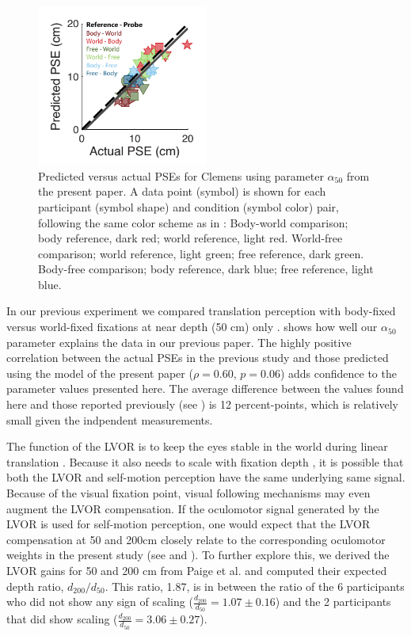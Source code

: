\begin{figure}
    \includegraphics[width=0.5\textwidth]{src/paper4/p4_figure6.pdf}

    \caption{Predicted versus actual PSEs for Clemens \protect\citeyear{clemens2015a} using parameter $\alpha_{50}$ from the present paper. A data point (symbol) is shown for each participant (symbol shape) and condition (symbol color) pair, following the same color scheme as in \protect{}: Body-world comparison; body reference, dark red; world reference, light red. World-free comparison; world reference, light green; free reference, dark green. Body-free comparison; body reference, dark blue; free reference, light blue.}
    \label{p4:fig6}
\end{figure}

In our previous experiment we compared translation perception with body-fixed versus world-fixed fixations at near depth (50 \si{\centi\metre}) only \cite{clemens2015a}.  shows how well our $\alpha_{50}$ parameter explains the data in our previous paper. The highly positive correlation between the actual PSEs in the previous study and those predicted using the model of the present paper ($\rho = 0.60$, $p = 0.06$) adds confidence to the parameter values presented here. The average difference between the values found here and those reported previously (see ) is 12  percent-points, which is relatively small given the indpendent measurements.

The function of the LVOR is to keep the eyes stable in the world during linear translation \cite{paige1989,busettini1994,paige1998}. Because it also needs to scale with fixation depth \cite{angelaki2004}, it is possible that both the LVOR and self-motion perception have the same underlying same signal. Because of the visual fixation point, visual following mechanisms may even augment the LVOR compensation. If the oculomotor signal generated by the LVOR is used for self-motion perception, one would expect that the LVOR compensation at 50 and 200cm closely relate to the corresponding oculomotor weights in the present study (see  and ). To further explore this, we derived the LVOR gains for 50 and 200 \si{\centi\metre} from Paige et al. \citeyear{paige1989} and computed their expected depth ratio, $d_{200} / d_{50}$. This ratio, 1.87, is in between the ratio of the 6 participants who did not show any sign of scaling ($\frac{d_{200}}{d_{50}} = 1.07 \pm 0.16$) and the 2 participants that did show scaling ($\frac{d_{200}}{d_{50}} = 3.06 \pm 0.27$).


